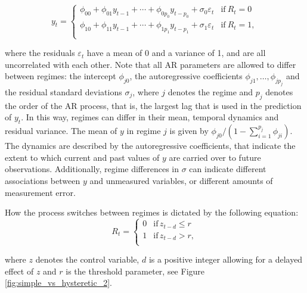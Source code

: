 \documentclass{article}
\begin{document}
\begin{equation}
y_t = 
\begin{cases}
\phi_{00} + \phi_{01} y_{t-1} + \cdots + \phi_{0 p_0} y_{t-p_0} + \sigma_{0} \varepsilon_t & \text{if}~R_{t} = 0\\
\phi_{10} + \phi_{11} y_{t-1} + \cdots + \phi_{1 p_1} y_{t-p_1} + \sigma_{1} \varepsilon_t & \text{if}~R_{t} = 1, \\
\end{cases}
\label{eqn:ar_processes}
\end{equation}

where the residuals $\varepsilon_t$ have a mean of 0 and a variance of 1, and are all uncorrelated with each other.
Note that all AR parameters are allowed to differ between regimes: the intercept $\phi_{j0}$, the autoregressive coefficients $\phi_{j1}, \dots, \phi_{j p_j}$ and the residual standard deviations $\sigma_j$, where $j$ denotes the regime and $p_j$ denotes the order of the AR process, that is, the largest lag that is used in the prediction of $y_t$.
In this way, regimes can differ in their mean, temporal dynamics and residual variance.
The mean of $y$ in regime $j$ is given by $\phi_{j0}/(1 - \sum_{i=1}^{p_j} \phi_{ji})$. 
The dynamics are described by the autoregressive coefficients, that indicate the extent to which current and past values of $y$ are carried over to future observations.
Additionally, regime differences in $\sigma$ can indicate different associations between $y$ and unmeasured variables, or different amounts of measurement error.

How the process switches between regimes is dictated by the following equation:
\begin{equation} \label{eqn:simple_switching}
R_t = \begin{cases}
0 & \mathrm{if} \, z_{t-d} \le r \\
1 & \mathrm{if} \, z_{t-d} > r, \\
\end{cases}
\end{equation}

where $z$ denotes the control variable, $d$ is a positive integer allowing for a delayed effect of $z$ and $r$ is the threshold parameter, see Figure \ref{fig:simple_vs_hysteretic_2}.
\end{document}
